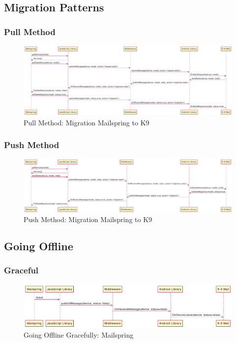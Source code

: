 \subsection{Migration Patterns}
\subsubsection{Pull Method}
\begin{figure}
    \includegraphics[width=\linewidth]{../figures/Migration-Mailspring-to-K9-Pull-Method}
    \centering
    \caption{Pull Method: Migration Mailspring to K9}
    \label{fig:Migration-Mailspring-to-K9-Pull-Method}
\end{figure}

\subsubsection{Push Method}
\begin{figure}
    \includegraphics[width=\linewidth]{../figures/Migration-Mailspring-to-K9-Push-Method}
    \centering
    \caption{Push Method: Migration Mailspring to K9}
    \label{fig:Migration-Mailspring-to-K9-Push-Method}
\end{figure}

\subsection{Going Offline}
\subsubsection{Graceful}
\begin{figure}
    \includegraphics[width=\linewidth]{../figures/Going-Offline-Graceful-Mailspring}
    \centering
    \caption{Going Offline Gracefully: Mailspring}
    \label{fig:Going-Offline-Graceful-Mailspring}
\end{figure}
